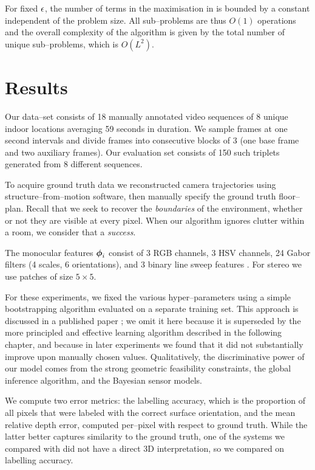 For fixed $\RoundoffEps$, the number of terms in the maximisation in
 is bounded by a constant independent of
the problem size. All sub--problems are thus $O(1)$ operations and the
overall complexity of the algorithm is given by the total number of
unique sub--problems, which is $O(L^2)$.

\section{Results}
\label{sect:results}
Our data--set consists of 18 manually annotated video sequences of 8
unique indoor locations averaging 59 seconds in duration. We sample
frames at one second intervals and divide frames into consecutive
blocks of 3 (one base frame and two auxiliary frames). Our evaluation
set consists of 150 such triplets generated from 8 different
sequences.

To acquire ground truth data we reconstructed camera trajectories
using structure--from--motion software, then manually specify the
ground truth floor--plan. Recall that we seek to recover the
\textit{boundaries} of the environment, whether or not they are
visible at every pixel. When our algorithm ignores clutter within a
room, we consider that a \textit{success}.

The monocular features $\Feature_i$ consist of 3 RGB channels, 3 HSV
channels, 24 Gabor filters (4 scales, 6 orientations), and 3 binary
line sweep features \cite{Lee09}. For stereo we use patches of size
$5 \times 5$.

For these experiments, we fixed the various hyper--parameters using a
simple bootstrapping algorithm evaluated on a separate training
set. This approach is discussed in a published paper \cite{Flint11};
we omit it here because it is superseded by the more principled and
effective learning algorithm described in the following chapter, and
because in later experiments we found that it did not substantially
improve upon manually chosen values. Qualitatively, the discriminative
power of our model comes from the strong geometric feasibility
constraints, the global inference algorithm, and the Bayesian sensor
models.

We compute two error metrics: the labelling accuracy, which is the
proportion of all pixels that were labeled with the correct surface
orientation, and the mean relative depth error, computed per--pixel
with respect to ground truth. While the latter better captures
similarity to the ground truth, one of the systems we compared with
did not have a direct 3D interpretation, so we compared on labelling
accuracy.

